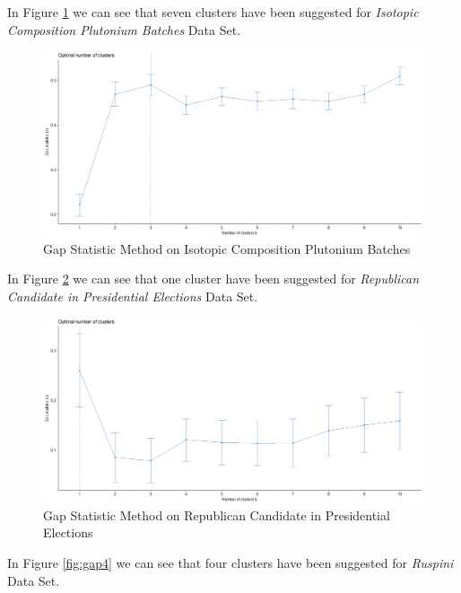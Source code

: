 \begin{itemize}
\newpage

In Figure \ref{fig:gap2} we can see that seven clusters have been suggested for \textit{Isotopic Composition Plutonium Batches} Data Set.

\begin{figure}[h!]
  \centering
  \includegraphics[scale=1.3]{figures/results/pluton/gap.png}
  \caption{Gap Statistic Method on Isotopic Composition Plutonium Batches}
  \label{fig:gap2}
\end{figure}

\vspace{15mm}

In Figure \ref{fig:gap3} we can see that one cluster have been suggested for \textit{Republican Candidate in Presidential Elections} Data Set.

\begin{figure}[h!]
  \centering
  \includegraphics[scale=1.3]{figures/results/republican/gap.png}
  \caption{Gap Statistic Method on Republican Candidate in Presidential Elections}
  \label{fig:gap3}
\end{figure}

\newpage

In Figure \ref{fig:gap4} we can see that four clusters have been suggested for \textit{Ruspini} Data Set.


\end{itemize}
